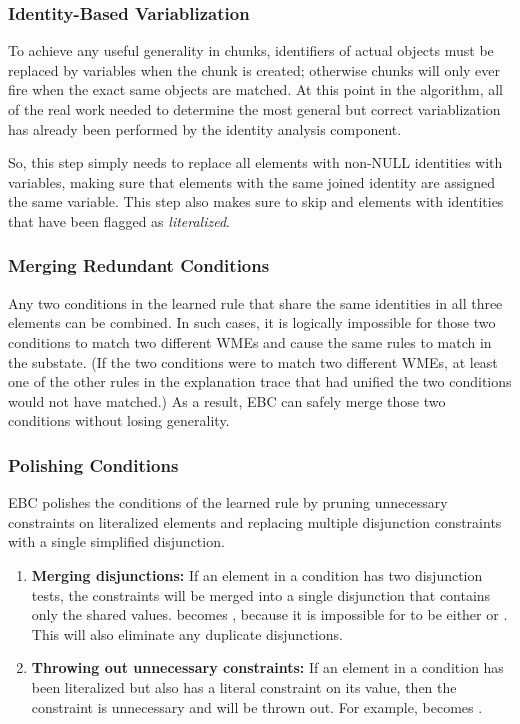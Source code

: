 \subsubsection{Identity-Based Variablization}

To achieve any useful generality in chunks, identifiers of actual objects must be replaced by variables when the chunk is created; otherwise chunks will only ever fire when the exact same objects are matched.  At this point in the algorithm, all of the real work needed to determine the most general but correct variablization has already been performed by the identity analysis component.  

So, this step simply needs to replace all elements with non-NULL identities with variables, making sure that elements with the same joined identity are assigned the same variable.  This step also makes sure to skip and elements with identities that have been flagged as \textit{literalized}.

\subsubsection{Merging Redundant Conditions}

Any two conditions in the learned rule that share the same identities in all three elements can be combined.  In such cases, it is logically impossible for those two conditions to match two different WMEs and cause the same rules to match in the substate.  (If the two conditions were to match two different WMEs, at least one of the other rules in the explanation trace that had unified the two conditions would not have matched.)  As a result, EBC can safely merge those two conditions without losing generality.  

\subsubsection{Polishing Conditions}

EBC polishes the conditions of the learned rule by pruning unnecessary constraints on literalized elements and replacing multiple disjunction constraints with a single simplified disjunction.

\begin{enumerate}
	\item \textbf{Merging disjunctions:} 
	If an element in a condition has two disjunction tests, the constraints will be merged into a single disjunction that contains only the shared values.  becomes , because it is impossible for  to be either  or .  This will also eliminate any duplicate disjunctions.

	\item \textbf{Throwing out unnecessary constraints:} 
	If an element in a condition has been literalized but also has a literal constraint on its value, then the constraint is unnecessary and will be thrown out.  For example,   becomes  .
\end{enumerate}

